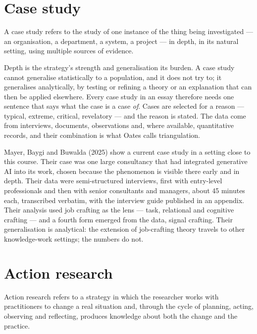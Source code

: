 \documentclass[11pt,a4paper,british,twoside=false,headings=small,chapterprefix=false,numbers=noenddot]{scrbook}
\newenvironment{block}[1]{\begin{tcolorbox}[scriptbox, title={#1}]}{\end{tcolorbox}}
\begin{document}
\section{Case study}

\begin{block}{Case study}
A case study refers to the study of one instance of the thing being investigated --- an organisation, a department, a system, a project --- in depth, in its natural setting, using multiple sources of evidence.
\end{block}

Depth is the strategy's strength and generalisation its burden. A case study cannot generalise statistically to a population, and it does not try to; it generalises analytically, by testing or refining a theory or an explanation that can then be applied elsewhere. Every case study in an essay therefore needs one sentence that says what the case is a case \emph{of}. Cases are selected for a reason --- typical, extreme, critical, revelatory --- and the reason is stated. The data come from interviews, documents, observations and, where available, quantitative records, and their combination is what Oates calls triangulation.

Mayer, Baygi and Buwalda (2025) show a current case study in a setting close to this course. Their case was one large consultancy that had integrated generative AI into its work, chosen because the phenomenon is visible there early and in depth. Their data were semi-structured interviews, first with entry-level professionals and then with senior consultants and managers, about 45 minutes each, transcribed verbatim, with the interview guide published in an appendix. Their analysis used job crafting as the lens --- task, relational and cognitive crafting --- and a fourth form emerged from the data, signal crafting. Their generalisation is analytical: the extension of job-crafting theory travels to other knowledge-work settings; the numbers do not.

\section{Action research}

\begin{block}{Action research}
Action research refers to a strategy in which the researcher works with practitioners to change a real situation and, through the cycle of planning, acting, observing and reflecting, produces knowledge about both the change and the practice.
\end{block}
\end{document}

